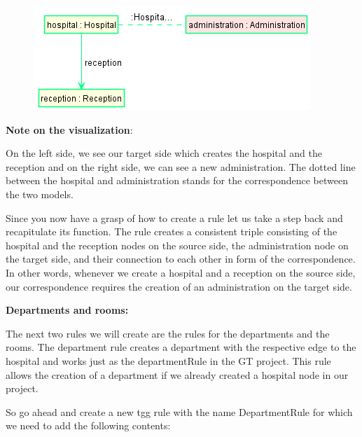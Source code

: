 \begin{figure}[h]
    \centering
    \includegraphics[scale=0.5 ]{pictures/h2a.png}
    \caption{}
    \label{TGG rule creation}
\end{figure}

\textbf{Note on the visualization}:

On the left side, we see our target side which creates the hospital and the reception and on the right side, we can see a new administration. The dotted line between the hospital and administration stands for the correspondence between the two models.\newline

Since you now have a grasp of how to create a rule let us take a step back and recapitulate its function. The rule creates a consistent triple consisting of the hospital and the reception nodes on the source side, the administration node on the target side, and their connection to each other in form of the correspondence. In other words, whenever we create a hospital and a reception on the source side, our correspondence requires the creation of an administration on the target side.

\clearpage

\textbf{Departments and rooms:}

The next two rules we will create are the rules for the departments and the rooms. 
The department rule creates a department with the respective edge to the hospital and works just as the departmentRule in the GT project. This rule allows the creation of a department if we already created a hospital node in our project. 

So go ahead and create a new tgg rule with the name \textsf{DepartmentRule} for which we need to add the following contents:\newline

